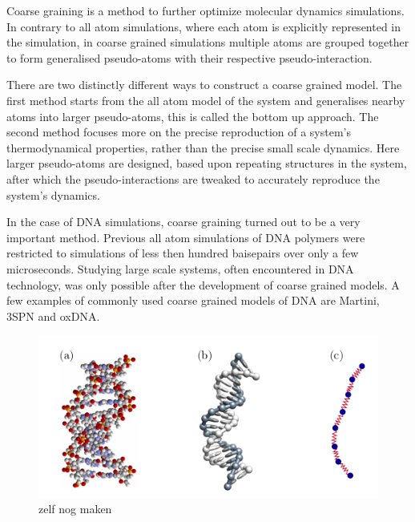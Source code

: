 Coarse graining is a method to further optimize molecular dynamics simulations.
In contrary to all atom simulations, where each atom is explicitly represented in the
simulation, in coarse grained simulations multiple atoms are grouped together to form
generalised pseudo-atoms with their respective pseudo-interaction.

There are two distinctly different ways to construct a coarse grained model. The first
method starts from the all atom model of the system and generalises nearby atoms into
larger pseudo-atoms, this is called the bottom up approach. The second method focuses
more on the precise reproduction of a system's thermodynamical properties, rather than
the precise small scale dynamics. Here larger pseudo-atoms are designed, based upon
repeating structures in the system, after which the pseudo-interactions are tweaked to
accurately reproduce the system's dynamics.

In the case of DNA simulations, coarse graining turned out to be a very important method.
Previous all atom simulations of DNA polymers were restricted to simulations of less then
hundred baisepairs over only a few microseconds. Studying large scale systems, often
encountered in DNA technology, was only possible after the development of coarse grained
models. A few examples of commonly used coarse grained models of DNA are Martini, 3SPN
and oxDNA.

\begin{figure}[htpb]
    \centering
    \includegraphics[width=0.6\linewidth]{Figures/CoarseGrained.png}
    \caption{zelf nog maken}%
    \label{fig:Figures/CoarseGrained}
\end{figure}
